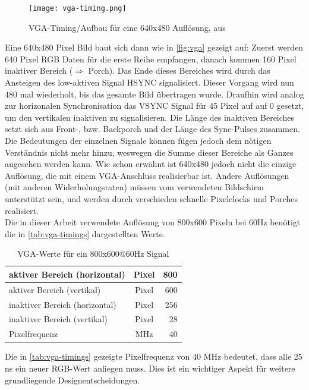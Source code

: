 \documentclass[a4paper,12pt,onesided]{report}
\begin{document}
\begin{figure}[H]
	\centering
	\texttt{[image: vga-timing.png]}
	\caption{VGA-Timing/Aufbau für eine 640x480 Auflösung, aus \cite{vga-timing}}
	\label{fig:vga}
\end{figure}

Eine 640x480 Pixel Bild baut sich dann wie in \autoref{fig:vga} gezeigt auf:
Zuerst werden 640 Pixel RGB Daten für die erste Reihe empfangen, danach kommen 160 Pixel inaktiver Bereich ($\Rightarrow$ Porch). Das Ende dieses Bereiches wird durch das Ansteigen des low-aktiven Signal HSYNC signalisiert. Dieser Vorgang wird nun 480 mal wiederholt, bis das gesamte Bild übertragen wurde. Draufhin wird analog zur horizonalen Synchronisation das VSYNC Signal für 45 Pixel auf auf 0 gesetzt, um den vertikalen inaktiven zu signalisieren. Die Länge des inaktiven Bereiches setzt sich aus Front-, bzw. Backporch und der Länge des Sync-Pulses zusammen. Die Bedeutungen der einzelnen Signale können fügen jedoch dem nötigen Verständnis nicht mehr hinzu, weswegen die Summe dieser Bereiche als Ganzes angesehen werden kann.
Wie schon erwähnt ist 640x480 jedoch nicht die einzige Auflösung, die mit einem VGA-Anschluss realisierbar ist. Andere Auflösungen (mit anderen Widerholungsraten) müssen vom verwendeten Bildschirm unterstützt sein, und werden durch verschieden schnelle Pixelclocks und Porches realisiert.\\
Die in dieser Arbeit verwendete Auflösung von 800x600 Pixeln bei 60Hz benötigt die in \autoref{tab:vga-timings} dargestellten Werte.

\begin{table}[H]
	\centering
	\begin{tabular}{|l|c|r|}	
		\hline
		aktiver Bereich (horizontal) & Pixel & 800 \\ \hline
		aktiver Bereich (vertikal) & Pixel & 600 \\ \hline
		inaktiver Bereich (horizontal) & Pixel & 256 \\ \hline
		inaktiver Bereich (vertikal) & Pixel & 28 \\ \hline
		Pixelfrequenz & MHz & 40 \\ \hline
	\end{tabular}
	\caption{VGA-Werte für ein 800x600@60Hz Signal}
	\label{tab:vga-timings}
\end{table}

Die in \autoref{tab:vga-timings} gezeigte Pixelfrequenz von 40 MHz bedeutet, dass alle 25 ns ein neuer RGB-Wert anliegen muss. Dies ist ein wichtiger Aspekt für weitere grundliegende Designentscheidungen. %
\end{document}
